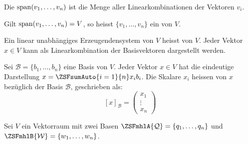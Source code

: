 
\begin{defbox}
Die  $\operatorname{span}(v_1, \dots, v_n)$ ist die Menge aller Linearkombinationen der Vektoren $v_i$.
\end{defbox}

\begin{defbox}[Erzeugendensystem]
Gilt $\operatorname{span}(v_1, \dots, v_n) = V$, so heisst $\{v_1, \dots, v_n\}$ ein  von $V$.
\end{defbox}

\begin{defbox}[Basis]
Ein linear unabhängiges Erzeugendensystem von $V$ heisst  von $V$. Jeder Vektor $x \in V$ kann  als Linearkombination der Basisvektoren dargestellt werden.
\end{defbox}


\begin{defbox}[Koordinatenvektor]
Sei $\mathcal{B} = \{b_1, \dots, b_n\}$ eine Basis von $V$. Jeder Vektor $x \in V$ hat die eindeutige Darstellung $x = \ZSFsumAuto{i=1}{n} x_i b_i$.
Die Skalare $x_i$ heissen  von $x$ bezüglich der Basis $\mathcal{B}$, geschrieben als:
\[ [x]_{\mathcal{B}} = \begin{pmatrix} x_1 \\ \vdots \\ x_n \end{pmatrix} \]
\end{defbox}

\ZSFNewColumn
{}

\begin{runintext}
Sei $V$ ein Vektorraum mit zwei Basen $\ZSFmhlA{\mathcal{Q}} = \{q_1, \dots, q_n\}$ und $\ZSFmhlB{\mathcal{W}} = \{w_1, \dots, w_n\}$.
\end{runintext}

